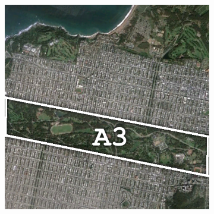 \begin{figure}[!b]
\begin{subfigure}[t]{0.19\textwidth}
\caption{}
\label{fig:cla2_c}
\end{subfigure}
\begin{subfigure}[t]{0.19\textwidth}
\includegraphics[width=\columnwidth]{Figures/ALOS2_SF_3Class/SunsetIm} 
\vspace{0.2cm}

\end{subfigure}
\end{figure}
